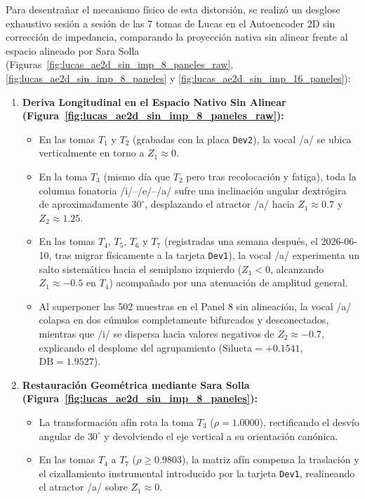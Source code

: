 \documentclass[11pt,a4paper,openany]{book}
\theoremstyle{definition}
\begin{document}
Para desentrañar el mecanismo físico de esta distorsión, se realizó un desglose exhaustivo sesión a sesión de las 7 tomas de Lucas en el Autoencoder 2D sin corrección de impedancia, comparando la proyección nativa sin alinear frente al espacio alineado por Sara Solla (Figuras~\ref{fig:lucas_ae2d_sin_imp_8_paneles_raw}, \ref{fig:lucas_ae2d_sin_imp_8_paneles} y \ref{fig:lucas_ae2d_sin_imp_16_paneles}):
\begin{enumerate}
    \item \textbf{Deriva Longitudinal en el Espacio Nativo Sin Alinear (Figura~\ref{fig:lucas_ae2d_sin_imp_8_paneles_raw}):}
    \begin{itemize}
        \item En las tomas $T_1$ y $T_2$ (grabadas con la placa \texttt{Dev2}), la vocal /a/ se ubica verticalmente en torno a $Z_1 \approx 0$.
        \item En la toma $T_3$ (mismo día que $T_2$ pero tras recolocación y fatiga), toda la columna fonatoria /i/--/e/--/a/ sufre una inclinación angular dextrógira de aproximadamente $30^\circ$, desplazando el atractor /a/ hacia $Z_1 \approx 0.7$ y $Z_2 \approx 1.25$.
        \item En las tomas $T_4$, $T_5$, $T_6$ y $T_7$ (registradas una semana después, el 2026-06-10, tras migrar físicamente a la tarjeta \texttt{Dev1}), la vocal /a/ experimenta un salto sistemático hacia el semiplano izquierdo ($Z_1 < 0$, alcanzando $Z_1 \approx -0.5$ en $T_4$) acompañado por una atenuación de amplitud general.
        \item Al superponer las 502 muestras en el Panel 8 sin alineación, la vocal /a/ colapsa en dos cúmulos completamente bifurcados y desconectados, mientras que /i/ se dispersa hacia valores negativos de $Z_2 \approx -0.7$, explicando el desplome del agrupamiento ($\text{Silueta} = +0.1541$, $\text{DB} = 1.9527$).
    \end{itemize}
    \item \textbf{Restauración Geométrica mediante Sara Solla (Figura~\ref{fig:lucas_ae2d_sin_imp_8_paneles}):}
    \begin{itemize}
        \item La transformación afín rota la toma $T_3$ ($\rho = 1.0000$), rectificando el desvío angular de $30^\circ$ y devolviendo el eje vertical a su orientación canónica.
        \item En las tomas $T_4$ a $T_7$ ($\rho \ge 0.9803$), la matriz afín compensa la traslación y el cizallamiento instrumental introducido por la tarjeta \texttt{Dev1}, realineando el atractor /a/ sobre $Z_1 \approx 0$.

\end{itemize}
\end{enumerate}
\end{document}
